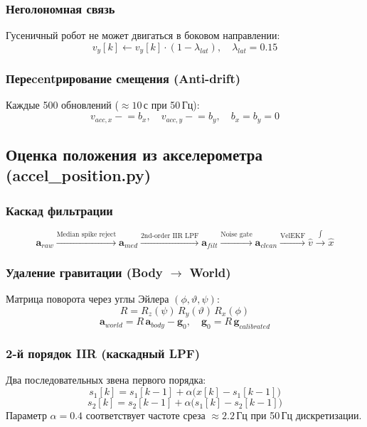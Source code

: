 \documentclass[12pt, a4paper]{article}
\begin{document}
\subsubsection{Неголономная связь}
Гусеничный робот не может двигаться в боковом направлении:
\begin{equation}
  v_y[k] \leftarrow v_y[k] \cdot (1 - \lambda_{lat}), \quad \lambda_{lat} = 0.15
\end{equation}

\subsubsection{Переcentрирование смещения (Anti-drift)}
Каждые 500 обновлений ($\approx 10$\,с при 50\,Гц):
\begin{equation}
  v_{acc,x} \mathrel{-}= b_x, \quad v_{acc,y} \mathrel{-}= b_y, \quad b_x = b_y = 0
\end{equation}

\subsection{Оценка положения из акселерометра (accel\_position.py)}
\label{sec:accel_pos}

\subsubsection{Каскад фильтрации}
\begin{equation}
  \mathbf{a}_{raw} \xrightarrow{\text{Median spike reject}}
  \mathbf{a}_{med} \xrightarrow{\text{2nd-order IIR LPF}}
  \mathbf{a}_{filt} \xrightarrow{\text{Noise gate}}
  \mathbf{a}_{clean} \xrightarrow{\text{VelEKF}}
  \hat{v} \xrightarrow{\int}
  \hat{x}
\end{equation}

\subsubsection{Удаление гравитации (Body $\to$ World)}
Матрица поворота через углы Эйлера $(\phi, \vartheta, \psi)$:
\begin{equation}
  R = R_z(\psi)\,R_y(\vartheta)\,R_x(\phi)
\end{equation}
\begin{equation}
  \mathbf{a}_{world} = R\,\mathbf{a}_{body} - \mathbf{g}_0, \quad
  \mathbf{g}_0 = R\,\mathbf{g}_{calibrated}
\end{equation}

\subsubsection{2-й порядок IIR (каскадный LPF)}
Два последовательных звена первого порядка:
\begin{equation}
  s_1[k] = s_1[k-1] + \alpha\bigl(x[k] - s_1[k-1]\bigr)
\end{equation}
\begin{equation}
  s_2[k] = s_2[k-1] + \alpha\bigl(s_1[k] - s_2[k-1]\bigr)
\end{equation}
Параметр $\alpha = 0.4$ соответствует частоте среза $\approx 2.2$\,Гц при 50\,Гц дискретизации.
\end{document}
